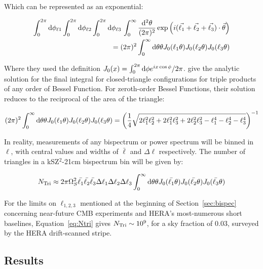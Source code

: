 Which can be represented as an exponential:

\begin{equation}
\begin{split}
\int^{2\pi}_0 {\rm d}\phi_{\ell1} \int^{2\pi}_0 {\rm d}\phi_{\ell2} \int^{2\pi}_0 {\rm d}\phi_{\ell3} \,\int^{\infty}_0 \frac{{\rm d^2\theta}}{(2\pi)^2}\exp\left(i(\vec{\ell_1}+\vec{\ell_2}+\vec{\ell_3})\cdot\vec{\theta}\right)\\
= (2\pi)^2\int^{\infty}_0 {\rm d}\theta \theta J_0(\ell_1\theta)J_0(\ell_2\theta)J_0(\ell_3\theta)
\end{split}
\end{equation}

Where they used the definition $J_0(x) = \int^{2\pi}_0 {\rm d}\phi e^{ix\cos\phi}/2\pi$. \cite{gradshteyn2000table} give the analytic solution for the final integral for closed-triangle configurations for triple products of any order of Bessel Function. For zeroth-order Bessel Functions, their solution reduces to the reciprocal of the area of the triangle:

\begin{equation}
(2\pi)^2\int^{\infty}_0 {\rm d}\theta \theta J_0(\ell_1\theta)J_0(\ell_2\theta)J_0(\ell_3\theta) = \left( \frac{1}{4}\sqrt{2\ell_1^2\ell_2^2 + 2\ell_1^2\ell_3^2 + 2\ell_2^2\ell_3^2 - \ell_1^4 - \ell_2^4 - \ell_3^4} \right)^{-1}
\end{equation}

In reality, measurements of any bispectrum or power spectrum will be binned in $\ell$, with central values and widths of $\bar{\ell}$ and $\Delta\ell$ respectively. The number of triangles in a kSZ$^2$-21cm bispectrum bin will be given by:

\begin{equation}
N_{\rm Tri} \approx 2\pi\Omega_S^2\bar{\ell_1}\bar{\ell_2}\bar{\ell_3}\Delta\ell_1\Delta\ell_2 \Delta\ell_3 \int^{\infty}_0 {\rm d}\theta \theta J_0(\bar{\ell_1}\theta)J_0(\bar{\ell_2}\theta)J_0(\bar{\ell_3}\theta)
\label{eq:Ntri}
\end{equation}

For the limits on $\ell_{1,2,3}$ mentioned at the beginning of Section~\ref{sec:bispec} concerning near-future CMB experiments and HERA's most-numerous short baselines, Equation~\ref{eq:Ntri} gives $N_{\rm Tri}\sim10^9$, for a sky fraction of 0.03, surveyed by the HERA drift-scanned stripe.

\subsection{Results}

